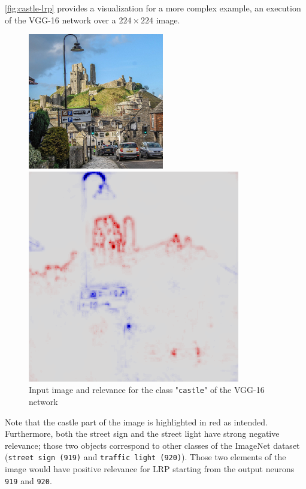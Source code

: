 \documentclass{../cs-classes/cs-classes}
\newcommand*{\1}{\digitsbb{1}}
\newcommand*{\0}{\digitsbb{0}}
\begin{document}
\autoref{fig:castle-lrp} provides a visualization for a more complex example, an execution of the VGG-16 network over a $224\times224$ image. 
\begin{figure}[H]
    \centering
    \begin{minipage}[c]{.49\textwidth}
        \centering
        \includegraphics[width=.65\textwidth]{castle.jpg}
    \end{minipage}
    \hspace*{-2.5cm}
    \begin{minipage}[c]{.49\textwidth}
        \centering
        \includegraphics[width=.65\textwidth]{castle-lrp.png}
    \end{minipage}
    \caption{Input image and relevance for the class "\texttt{castle}" of the VGG-16 network}
    \label{fig:castle-lrp}
\end{figure}
Note that the castle part of the image is highlighted in red as intended. Furthermore, both the street sign and the street light have strong negative relevance; those two objects correspond to other classes of the ImageNet dataset (\texttt{street sign (919)} and \texttt{traffic light (920)}). Those two elements of the image would have positive relevance for LRP starting from the output neurons \texttt{919} and \texttt{920}.
\end{document}
